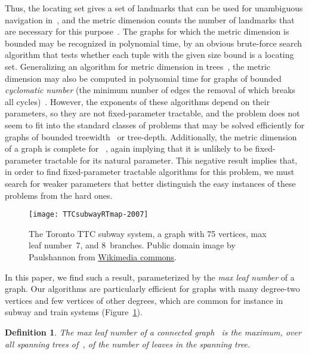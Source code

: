 \documentclass{jgaa-art}
\newtheorem{definition}{Definition}
\begin{document}
Thus, the locating set gives a set of landmarks that can be used for unambiguous navigation in~, and the metric dimension counts the number of landmarks that are necessary for this purpose~\cite{KhuRagRos-DAM-96}.
The graphs for which the metric dimension is bounded may be recognized in polynomial time, by an obvious brute-force search algorithm that tests whether each tuple with the given size bound is a locating set. Generalizing an algorithm for metric dimension in trees~\cite{HarMel-AC-76}, the metric dimension may also be computed in polynomial time for graphs of bounded \emph{cyclomatic number} (the minimum number of edges the removal of which breaks all cycles)~\cite{EpsLevWoe-WG-12}. However, the exponents of these algorithms depend on their parameters, so they are not fixed-parameter tractable, and the problem does not seem to fit into the standard classes of problems that may be solved efficiently for graphs of bounded treewidth~\cite{DiaPotSer-ESA-12} or tree-depth. Additionally, the metric dimension of a graph is complete for ~\cite{HarNic-CCC-13}, again implying that it is unlikely to be fixed-parameter tractable for its natural parameter. This negative result implies that, in order to find fixed-parameter tractable algorithms for this problem, we must search for weaker parameters that better distinguish the easy instances of these problems from the hard ones.

\begin{figure}[t]
\centering\texttt{[image: TTCsubwayRTmap-2007]}
\caption{The Toronto TTC subway system, a graph with 75 vertices, max leaf number~7, and 8~branches. Public domain image by Paulshannon from \href{http://commons.wikimedia.org/wiki/File:TTCsubwayRTmap-2007.svg}{Wikimedia commons}.}
\label{fig:TTC}
\end{figure}

In this paper, we find such a result, parameterized by the \emph{max leaf number} of a graph.  Our algorithms are particularly efficient for graphs with many degree-two vertices and few vertices of other degrees, which are common for instance in subway and train systems (Figure~\ref{fig:TTC}).

\begin{definition}
The \emph{max leaf number} of a connected graph~ is the maximum, over all spanning trees of~, of the number of leaves in the spanning tree.
\end{definition}
\end{document}
